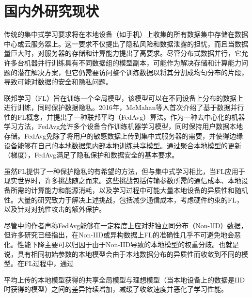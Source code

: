 \section{国内外研究现状}



传统的集中式学习要求将在本地设备（如手机）上收集的所有数据集中存储在数据中心或云服务器上。这一要求不仅提出了隐私风险和数据泄露的担忧，而且当数据量巨大时，对服务器的存储和计算能力提出了高要求。尽管分布式数据并行\supercite{dean2012large}，它允许多台机器并行训练具有不同数据组的模型副本，可能作为解决存储和计算能力问题的潜在解决方案，但它仍需要访问整个训练数据以将其分割成均匀分布的片段，导致可能对数据的安全和隐私问题。

联邦学习（FL）旨在训练一个全局模型，该模型可以在不同设备上分布的数据上进行训练，同时保护数据隐私。2016年，McMahan等人\supercite{mcmahan2017communication}首次介绍了基于数据并行性的FL概念，并提出了一种联邦平均（FedAvg）算法。作为一种去中心化的机器学习方法，FedAvg允许多个设备合作训练机器学习模型，同时保持用户数据本地存储。FedAvg免除了将用户的敏感数据上传到集中式服务器的需要，并使得边缘设备能够在自己的本地数据集内部本地训练共享模型。通过聚合本地模型的更新（梯度），FedAvg满足了隐私保护和数据安全的基本要求。

虽然FL提供了一种保护隐私的有希望的方法，但与集中式学习相比，当FL应用于现实世界时，许多挑战随之而来\supercite{yang2019federated}。这些挑战包括传输参数所需的通信成本、本地设备所需的计算能力和能源消耗，以及学习过程中可能大量本地设备的异质性和随机性。大量的研究致力于解决上述挑战，包括减少通信成本\supercite{chen2019communication,mcmahan2017communication,mills2019communication,xu2020}，考虑硬件约束的FL\supercite{duan2019astraea,lim2020federated}，以及针对对抗性攻击的额外保护\supercite{kairouz2019advances,254465,zhu2020distributed}。

尽管\supercite{mcmahan2017communication}中的作者声称FedAvg能够在一定程度上应对非独立同分布（Non-IID）数据，但许多研究已经指出，在Non-IID或异构数据上FL的准确性几乎不可避免地会恶化\supercite{zhao2018federated}。性能下降主要可以归因于由于Non-IID导致的本地模型的权重分歧。也就是说，具有相同初始参数的本地模型会由于本地数据分布的异质性而收敛到不同的模型。在FL过程中，通过

平均上传的本地模型获得的共享全局模型与理想模型（当本地设备上的数据是IID时获得的模型）之间的差异持续增加，减缓了收敛速度并恶化了学习性能。

